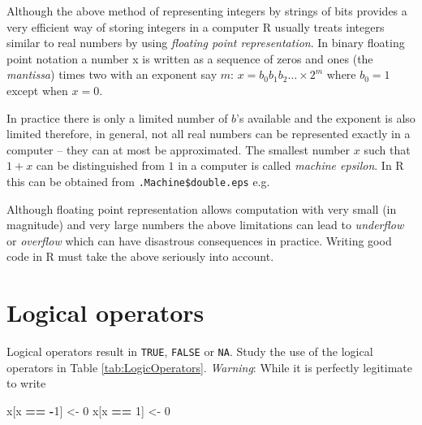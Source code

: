 \documentclass[
]{book}
\newenvironment{Shaded}{\begin{snugshade}}{\end{snugshade}}
\newcommand{\CommentTok}[1]{\textcolor[rgb]{0.56,0.35,0.01}{\textit{#1}}}
\newcommand{\DecValTok}[1]{\textcolor[rgb]{0.00,0.00,0.81}{#1}}
\newcommand{\NormalTok}[1]{#1}
\newcommand{\OtherTok}[1]{\textcolor[rgb]{0.56,0.35,0.01}{#1}}
\newcommand{\SpecialCharTok}[1]{\textcolor[rgb]{0.81,0.36,0.00}{\textbf{#1}}}
\begin{document}
Although the above method of representing integers by strings of bits provides a very efficient way of storing integers in a computer R usually treats integers similar to real numbers by using \emph{{floating point representation}}. In binary floating point notation a number x is written as a sequence of zeros and ones (the \emph{{mantissa}}) times two with an exponent say \(m\): \(x=b_0 b_1 b_2…×2^m\) where \(b_0=1\) except when \(x=0\).

In practice there is only a limited number of \(b\)'s available and the exponent is also limited therefore, in general, not all real numbers can be represented exactly in a computer -- they can at most be approximated. The smallest number \(x\) such that \(1 + x\) can be distinguished from \(1\) in a computer is called \emph{{machine epsilon}}. In R this can be obtained from \texttt{.Machine\$double.eps} e.g.

\begin{Shaded}
\end{Shaded}

Although floating point representation allows computation with very small (in magnitude) and very large numbers the above limitations can lead to \emph{{underflow}} or \emph{{overflow}} which can have disastrous consequences in practice. Writing good code in R must take the above seriously into account.

\section{Logical operators}\label{logical-operators}

Logical operators result in \texttt{TRUE}, \texttt{FALSE} or \texttt{NA}. Study the use of the logical operators in Table \ref{tab:LogicOperators}. \emph{{Warning}}: While it is perfectly legitimate to write

\begin{Shaded}
\begin{Highlighting}[]
\NormalTok{x[x }\SpecialCharTok{==} \SpecialCharTok{{-}}\DecValTok{1}\NormalTok{] }\OtherTok{\textless{}{-}} \DecValTok{0}
\NormalTok{x[x }\SpecialCharTok{==} \DecValTok{1}\NormalTok{] }\OtherTok{\textless{}{-}} \DecValTok{0} 
\end{Highlighting}
\end{Shaded}
\end{document}
